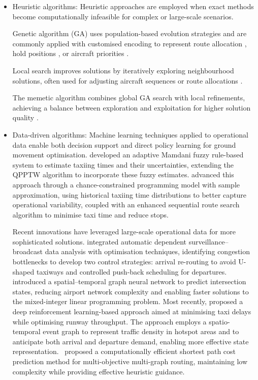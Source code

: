 \documentclass{article}
\begin{document}
\begin{itemize}
\item Heuristic algorithms: Heuristic approaches are employed when exact methods become computationally infeasible for complex or large-scale scenarios.

Genetic algorithm (GA) uses population-based evolution strategies and are commonly applied with customised encoding to represent route allocation \cite{garcia2002planning, gotteland2003handling, gotteland2003genetic, garcia2005optimization, brownlee2018rolling}, hold positions \cite{garcia2002planning, garcia2005optimization, gotteland2003genetic}, or aircraft priorities \cite{gotteland2003genetic, brownlee2018rolling}.

Local search improves solutions by iteratively exploring neighbourhood solutions, often used for adjusting aircraft sequences or route allocations \cite{ravizza2014more, adacher2018airport}.

The memetic algorithm combines global GA search with local refinements, achieving a balance between exploration and exploitation for higher solution quality \cite{beke2023routing}. 

\item Data-driven algorithms: Machine learning techniques applied to operational data enable both decision support and direct policy learning for ground movement optimisation. \cite{brownlee2018fuzzy} developed an adaptive Mamdani fuzzy rule-based system to estimate taxiing times and their uncertainties, extending the QPPTW algorithm to incorporate these fuzzy estimates. \cite{wang2021chance} advanced this approach through a chance-constrained programming model with sample approximation, using historical taxiing time distributions to better capture operational variability, coupled with an enhanced sequential route search algorithm to minimise taxi time and reduce stops.

Recent innovations have leveraged large-scale operational data for more sophisticated solutions. \cite{ma2022delay} integrated automatic dependent surveillance–broadcast data analysis with optimisation techniques, identifying congestion bottlenecks to develop two control strategies: arrival re-routing to avoid U-shaped taxiways and controlled push-back scheduling for departures. \cite{wang2024quick} introduced a spatial–temporal graph neural network to predict intersection states, reducing airport network complexity and enabling faster solutions to the mixed-integer linear programming problem. Most recently, \cite{ali2024toward} proposed a deep reinforcement learning-based approach aimed at minimising taxi delays while optimising runway throughput. The approach employs a spatio-temporal event graph to represent traffic density in hotspot areas and to anticipate both arrival and departure demand, enabling more effective state representation.~\cite{liu2024extracting} proposed a computationally efficient shortest path cost prediction method for multi-objective multi-graph routing, maintaining low complexity while providing effective heuristic guidance. 

\end{itemize}
\end{document}
